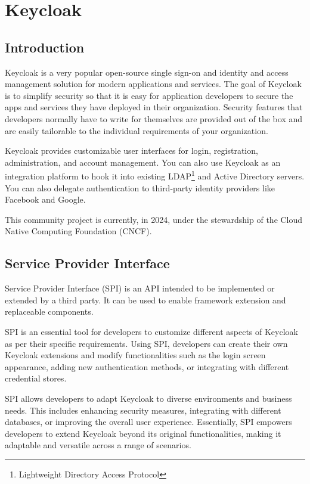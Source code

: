 \chapter{Keycloak}

\section{Introduction}
Keycloak is a very popular open-source single sign-on and identity and access management solution for modern applications and services.
The goal of Keycloak is to simplify security so that it is easy for application developers to secure the apps and services they have deployed in their organization.
Security features that developers normally have to write for themselves are provided out of the box and are easily tailorable to the individual requirements of your organization.

Keycloak provides customizable user interfaces for login, registration, administration, and account management.
You can also use Keycloak as an integration platform to hook it into existing LDAP\footnote{Lightweight Directory Access Protocol} and Active Directory servers.
You can also delegate authentication to third-party identity providers like Facebook and Google.

This community project is currently, in 2024, under the stewardship of the Cloud Native Computing Foundation (CNCF).\cite{keycloak-web}

\section{Service Provider Interface}\label{keycloak-spi}
Service Provider Interface (SPI) is an API intended to be implemented or extended by a third party.
It can be used to enable framework extension and replaceable components.\cite{keycloak-spi}

SPI is an essential tool for developers to customize different aspects of Keycloak as per their specific requirements.
Using SPI, developers can create their own Keycloak extensions and modify functionalities such as the login screen appearance, adding new authentication methods, or integrating with different credential stores.

SPI allows developers to adapt Keycloak to diverse environments and business needs.
This includes enhancing security measures, integrating with different databases, or improving the overall user experience. Essentially, SPI empowers developers to extend Keycloak beyond its original functionalities, making it adaptable and versatile across a range of scenarios.

